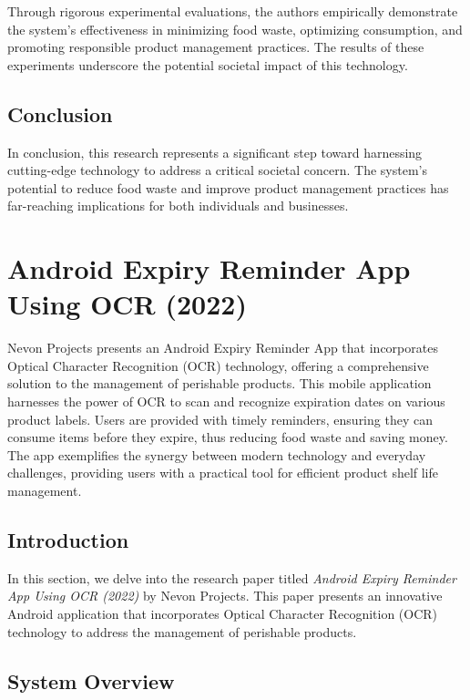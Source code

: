 Through rigorous experimental evaluations, the authors empirically demonstrate the system's effectiveness in minimizing food waste, optimizing consumption, and promoting responsible product management practices. The results of these experiments underscore the potential societal impact of this technology.

\subsection{Conclusion}

In conclusion, this research represents a significant step toward harnessing cutting-edge technology to address a critical societal concern. The system's potential to reduce food waste and improve product management practices has far-reaching implications for both individuals and businesses.




\section{Android Expiry Reminder App Using OCR (2022)}

Nevon Projects presents an Android Expiry Reminder App that incorporates Optical Character Recognition (OCR) technology, offering a comprehensive solution to the management of perishable products. This mobile application harnesses the power of OCR to scan and recognize expiration dates on various product labels. Users are provided with timely reminders, ensuring they can consume items before they expire, thus reducing food waste and saving money. The app exemplifies the synergy between modern technology and everyday challenges, providing users with a practical tool for efficient product shelf life management.

\subsection{Introduction}

In this section, we delve into the research paper titled \textit{Android Expiry Reminder App Using OCR (2022)} by Nevon Projects. This paper presents an innovative Android application that incorporates Optical Character Recognition (OCR) technology to address the management of perishable products.

\subsection{System Overview}

